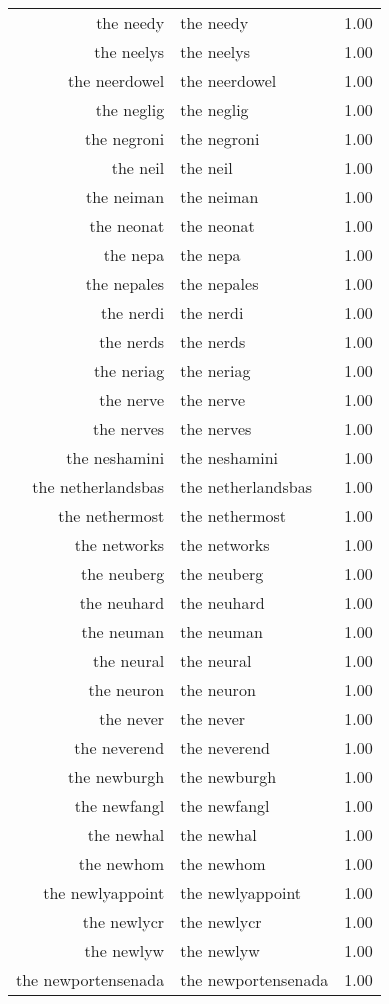 \begin{table}[ht]
\begin{tabular}{rlr}
  the needy & the needy & 1.00 \\ 
  the neelys & the neelys & 1.00 \\ 
  the neerdowel & the neerdowel & 1.00 \\ 
  the neglig & the neglig & 1.00 \\ 
  the negroni & the negroni & 1.00 \\ 
  the neil & the neil & 1.00 \\ 
  the neiman & the neiman & 1.00 \\ 
  the neonat & the neonat & 1.00 \\ 
  the nepa & the nepa & 1.00 \\ 
  the nepales & the nepales & 1.00 \\ 
  the nerdi & the nerdi & 1.00 \\ 
  the nerds & the nerds & 1.00 \\ 
  the neriag & the neriag & 1.00 \\ 
  the nerve & the nerve & 1.00 \\ 
  the nerves & the nerves & 1.00 \\ 
  the neshamini & the neshamini & 1.00 \\ 
  the netherlandsbas & the netherlandsbas & 1.00 \\ 
  the nethermost & the nethermost & 1.00 \\ 
  the networks & the networks & 1.00 \\ 
  the neuberg & the neuberg & 1.00 \\ 
  the neuhard & the neuhard & 1.00 \\ 
  the neuman & the neuman & 1.00 \\ 
  the neural & the neural & 1.00 \\ 
  the neuron & the neuron & 1.00 \\ 
  the never & the never & 1.00 \\ 
  the neverend & the neverend & 1.00 \\ 
  the newburgh & the newburgh & 1.00 \\ 
  the newfangl & the newfangl & 1.00 \\ 
  the newhal & the newhal & 1.00 \\ 
  the newhom & the newhom & 1.00 \\ 
  the newlyappoint & the newlyappoint & 1.00 \\ 
  the newlycr & the newlycr & 1.00 \\ 
  the newlyw & the newlyw & 1.00 \\ 
  the newportensenada & the newportensenada & 1.00 \\ 

\end{tabular}
\end{table}
